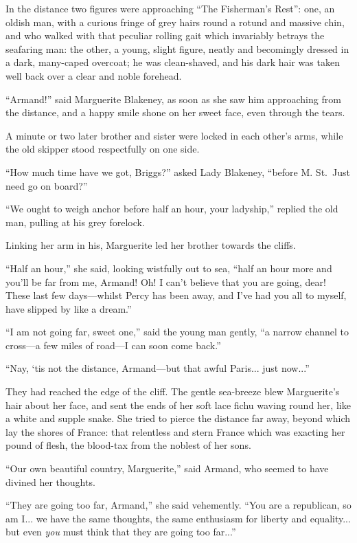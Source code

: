 \documentclass[paper=a5,BCOR=7mm,twoside,DIV=calc,12pt,usegeometry,chapterprefix,endperiod,headings=big]{scrbook}
\begin{document}
In the distance two figures were approaching \enquote{The Fisherman's Rest}: one, an oldish man, with a curious fringe of grey hairs round a rotund and massive chin, and who walked with that peculiar rolling gait which invariably betrays the seafaring man: the other, a young, slight figure, neatly and becomingly dressed in a dark, many-caped overcoat; he was clean-shaved, and his dark hair was taken well back over a clear and noble forehead.

\enquote{Armand!} said Marguerite Blakeney, as soon as she saw him approaching from the distance, and a happy smile shone on her sweet face, even through the tears.

A minute or two later brother and sister were locked in each other's arms, while the old skipper stood respectfully on one side.

\enquote{How much time have we got, Briggs?} asked Lady Blakeney, \enquote{before M. St.~Just need go on board?}

\enquote{We ought to weigh anchor before half an hour, your ladyship,} replied the old man, pulling at his grey forelock.

Linking her arm in his, Marguerite led her brother towards the cliffs.

\enquote{Half an hour,} she said, looking wistfully out to sea, \enquote{half an hour more and you'll be far from me, Armand! Oh! I can't believe that you are going, dear! These last few days---whilst Percy has been away, and I've had you all to myself, have slipped by like a dream.}

\enquote{I am not going far, sweet one,} said the young man gently, \enquote{a narrow channel to cross---a few miles of road---I can soon come back.}

\enquote{Nay, `tis not the distance, Armand---but that awful Paris... just now...}

They had reached the edge of the cliff. The gentle sea-breeze blew Marguerite's hair about her face, and sent the ends of her soft lace fichu waving round her, like a white and supple snake. She tried to pierce the distance far away, beyond which lay the shores of France: that relentless and stern France which was exacting her pound of flesh, the blood-tax from the noblest of her sons.

\enquote{Our own beautiful country, Marguerite,} said Armand, who seemed to have divined her thoughts.

\enquote{They are going too far, Armand,} she said vehemently. \enquote{You are a republican, so am I... we have the same thoughts, the same enthusiasm for liberty and equality... but even \textit{you} must think that they are going too far...}
\end{document}
